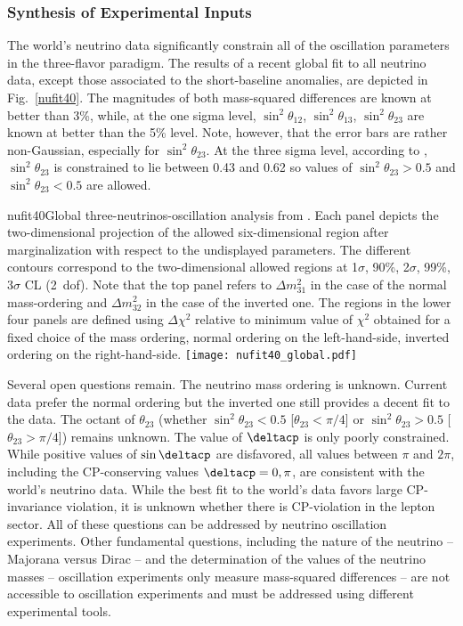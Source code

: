 \subsubsection{Synthesis of Experimental Inputs} 

The world's neutrino data significantly constrain all of the oscillation parameters in the three-flavor paradigm. The results of a recent global fit \cite{Esteban:2018azc} to all neutrino data, except those associated to the short-baseline anomalies, are depicted in Fig.~\ref{nufit40}. The magnitudes of both mass-squared differences are known at better than 3\%, while, at the one sigma level, $\sin^2\theta_{12}$, $\sin^2\theta_{13}$, $\sin^2\theta_{23}$ are known at better than the 5\% level. Note, however, that the error bars are rather non-Gaussian, especially for $\sin^2\theta_{23}$. At the three sigma level,  according to \cite{Esteban:2018azc}, $\sin^2\theta_{23}$ is constrained to lie between 0.43 and 0.62 so values of $\sin^2\theta_{23}>0.5$ and $\sin^2\theta_{23}<0.5$ are allowed.
\begin{dunefigure}{nufit40}{Global three-neutrinos-oscillation analysis from \cite{Esteban:2018azc}. Each panel depicts the two-dimensional projection of the allowed six-dimensional region after marginalization with respect to the undisplayed parameters. The different contours correspond to the two-dimensional allowed regions at 1$\sigma$, 90\%, 2$\sigma$, 99\%, 3$\sigma$ CL (2~dof). Note that the top panel refers to $\Delta m^2_{31}$ in the case of the normal mass-ordering and $\Delta m^2_{32}$ in the case of the inverted one. The regions in the lower four panels are defined using $\Delta \chi^2$ relative to minimum value of $\chi^2$ obtained for a fixed choice of the mass ordering, normal ordering on the left-hand-side, inverted ordering on the right-hand-side.
}
  \texttt{[image: nufit40\_global.pdf]}
\end{dunefigure}

Several open questions remain. The neutrino mass ordering is unknown. Current data prefer the normal ordering but the inverted one still provides a decent fit to the data. The octant of $\theta_{23}$ (whether $\sin^2\theta_{23}<0.5$ [$\theta_{23}<\pi/4$] or $\sin^2\theta_{23}>0.5$ [$\theta_{23}>\pi/4$]) remains unknown. The value of $\deltacp$ is only poorly constrained. While positive values of $\sin\deltacp$ are disfavored, all values between $\pi$ and $2\pi$, including the CP-conserving values $\deltacp=0,\pi$, are consistent with the world's neutrino data. While the best fit to the world's data favors large CP-invariance violation, it is unknown whether there is CP-violation in the lepton sector. All of these questions can be addressed by neutrino oscillation experiments. Other fundamental questions, including the nature of the neutrino -- Majorana versus Dirac -- and the determination of the values of the neutrino masses -- oscillation experiments only measure mass-squared differences -- are not accessible to oscillation experiments and must be addressed using different experimental tools.  

